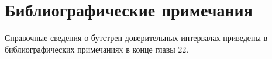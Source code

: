 
\section{Библиографические примечания}
Справочные сведения о бутстреп доверительных интервалах приведены в библиографических примечаниях в конце главы 22.






